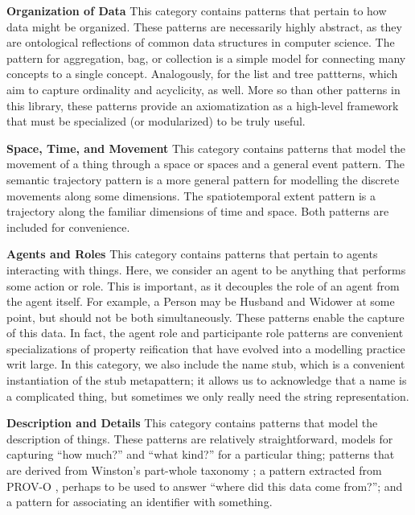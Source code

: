 \noindent\textbf{Organization of Data} This category contains patterns that pertain to how data might be organized. These patterns are necessarily highly abstract, as they are ontological reflections of common data structures in computer science. The pattern for aggregation, bag, or collection is a simple model for connecting many concepts to a single concept. Analogously, for the list and tree pattterns, which aim to capture ordinality and acyclicity, as well. More so than other patterns in this library, these patterns provide an axiomatization as a high-level framework that must be specialized (or modularized) to be truly useful.

\noindent\textbf{Space, Time, and Movement} This category contains patterns that model the movement of a thing through a space or spaces and a general event pattern. The semantic trajectory pattern is a more general pattern for modelling the discrete movements along some dimensions. The spatiotemporal extent pattern is a trajectory along the familiar dimensions of time and space. Both patterns are included for convenience.

\noindent\textbf{Agents and Roles} This category contains patterns that pertain to agents interacting with things. Here, we consider an agent to be anything that performs some action or role. This is important, as it decouples the role of an agent from the agent itself. For example, a \textsf{Person} may be \textsf{Husband} and \textsf{Widower} at some point, but should not be both simultaneously. These patterns enable the capture of this data. In fact, the agent role and participante role patterns are convenient specializations of property reification that have evolved into a modelling practice writ large. In this category, we also include the name stub, which is a convenient instantiation of the stub metapattern; it allows us to acknowledge that a name is a complicated thing, but sometimes we only really need the string representation.

\noindent\textbf{Description and Details} This category contains patterns that model the description of things. These patterns are relatively straightforward, models for capturing ``how much?'' and ``what kind?'' for a particular thing; patterns that are derived from Winston's part-whole taxonomy \cite{partof}; a pattern extracted from PROV-O \cite{provo}, perhaps to be used to answer ``where did this data come from?''; and a pattern for associating an identifier with something.
